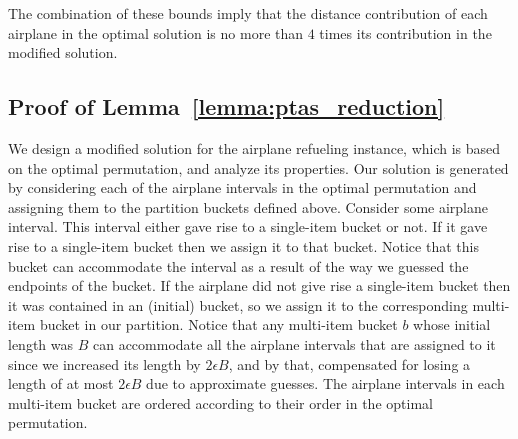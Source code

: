 \documentclass[11pt]{article}
\theoremstyle{plain}
\theoremstyle{definition}
\begin{document}
The combination of these bounds imply that the distance contribution of each airplane in the optimal solution is no more than $4$ times its contribution in the modified solution.

\subsection{Proof of Lemma~\ref{lemma:ptas_reduction}}

We design a modified solution for the airplane refueling instance, which is based on the optimal permutation, and analyze its properties. Our solution is generated by considering each of the airplane intervals in the optimal permutation and assigning them to the partition buckets defined above. Consider some airplane interval. This interval either gave rise to a single-item bucket or not. If it gave rise to a single-item bucket then we assign it to that bucket. Notice that this bucket can accommodate the interval as a result of the way we guessed the endpoints of the bucket. If the airplane did not give rise a single-item bucket then it was contained in an (initial) bucket, so we assign it to the corresponding multi-item bucket in our partition. Notice that any multi-item bucket $b$ whose initial length was $B$ can accommodate all the airplane intervals that are assigned to it since we increased its length by $2 \epsilon B$, and by that, compensated for losing a length of at most $2 \epsilon B$ due to approximate guesses. The airplane intervals in each multi-item bucket are ordered according to their order in the optimal permutation.
\end{document}
